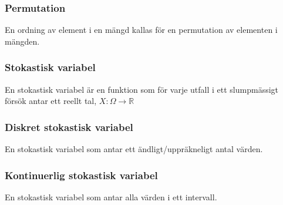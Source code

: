 \subsubsection{Permutation}
En ordning av element i en mängd kallas för en permutation av elementen i mängden.
\subsubsection{Stokastisk variabel}
En stokastisk variabel är en funktion som för varje utfall i ett slumpmässigt försök antar ett reellt tal, $X:\Omega\rightarrow\mathbb{R}$
\subsubsection{Diskret stokastisk variabel}
En stokastisk variabel som antar ett ändligt/uppräkneligt antal värden.

\subsubsection{Kontinuerlig stokastisk variabel}
En stokastisk variabel som antar alla värden i ett intervall.
